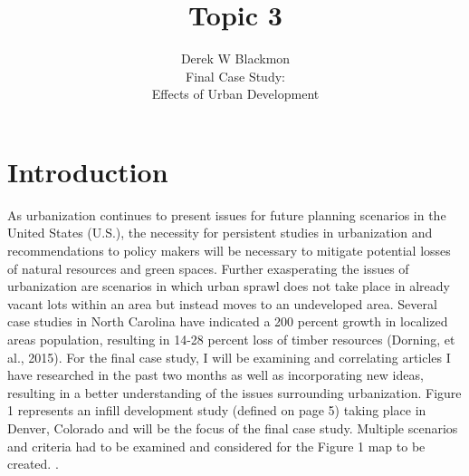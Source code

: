 \documentclass[20pt]{article}
\begin{document}
\title{Topic 3}
\author{Derek W Blackmon\\
Final Case Study:\\
Effects of Urban Development}

\maketitle







\renewcommand*\contentsname{\underline{TABLE OF CONTENTS}}

\newpage

\tableofcontents
\thispagestyle{empty}
\setcounter{page}{0}

\setlength{\parindent}{0cm}

\flushleft
\newpage

\section {Introduction}
As urbanization continues to present issues for future planning scenarios in the United States (U.S.), the necessity for persistent studies in urbanization and recommendations to policy makers will be necessary to mitigate potential losses of natural resources and green spaces. Further exasperating the issues of urbanization are scenarios in which urban sprawl does not take place in already vacant lots within an area but instead moves to an undeveloped area. Several case studies in North Carolina have indicated a 200 percent growth in localized areas population, resulting in 14-28 percent loss of timber resources (Dorning, et al., 2015). For the final case study, I will be examining and correlating articles I have researched in the past two months as well as incorporating new ideas, resulting in a better understanding of the issues surrounding urbanization. Figure 1 represents an infill development study (defined on page 5) taking place in Denver, Colorado and will be the focus of the final case study. Multiple scenarios and criteria had to be examined and considered for the Figure 1 map to be created. . 
\end{document}
